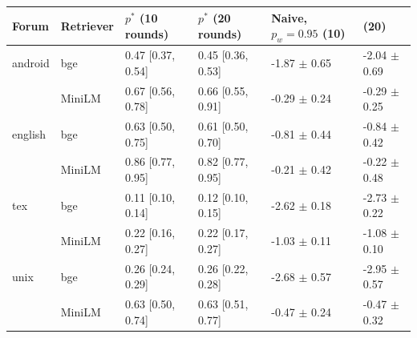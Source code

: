 \begin{tabular}{llllll}\toprule Forum & Retriever & $p^*$ (10 rounds) & $p^*$ (20 rounds) & Naive, $p_w{=}0.95$ (10) & (20)\\\midrule
android & bge & 0.47 [0.37, 0.54] & 0.45 [0.36, 0.53] & -1.87 $\pm$ 0.65 & -2.04 $\pm$ 0.69\\
 & MiniLM & 0.67 [0.56, 0.78] & 0.66 [0.55, 0.91] & -0.29 $\pm$ 0.24 & -0.29 $\pm$ 0.25\\
english & bge & 0.63 [0.50, 0.75] & 0.61 [0.50, 0.70] & -0.81 $\pm$ 0.44 & -0.84 $\pm$ 0.42\\
 & MiniLM & 0.86 [0.77, 0.95] & 0.82 [0.77, 0.95] & -0.21 $\pm$ 0.42 & -0.22 $\pm$ 0.48\\
tex & bge & 0.11 [0.10, 0.14] & 0.12 [0.10, 0.15] & -2.62 $\pm$ 0.18 & -2.73 $\pm$ 0.22\\
 & MiniLM & 0.22 [0.16, 0.27] & 0.22 [0.17, 0.27] & -1.03 $\pm$ 0.11 & -1.08 $\pm$ 0.10\\
unix & bge & 0.26 [0.24, 0.29] & 0.26 [0.22, 0.28] & -2.68 $\pm$ 0.57 & -2.95 $\pm$ 0.57\\
 & MiniLM & 0.63 [0.50, 0.74] & 0.63 [0.51, 0.77] & -0.47 $\pm$ 0.24 & -0.47 $\pm$ 0.32\\
\bottomrule\end{tabular}
